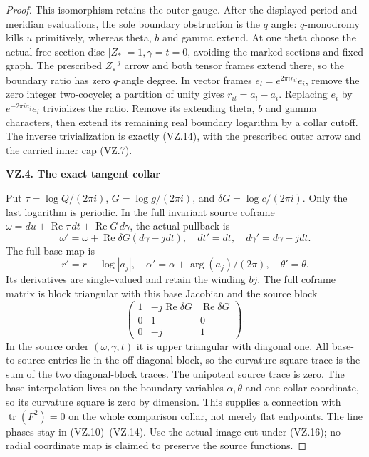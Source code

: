 \begin{proof}
This isomorphism retains the outer gauge. After the displayed period
and meridian evaluations, the sole boundary obstruction is the \(q\)
angle: \(q\)-monodromy kills \(u\) primitively, whereas theta, \(b\)
and gamma extend. At one theta choose the actual free section disc
\(|Z_*|=1,\gamma=t=0\), avoiding the marked sections and fixed graph.
The prescribed \(Z_*^{-j}\) arrow and both tensor frames extend there,
so the boundary ratio has zero \(q\)-angle degree. In vector frames
\(e_l=e^{2\pi ir_{il}}e_i\), remove the zero integer two-cocycle;
a partition of unity gives \(r_{il}=a_l-a_i\).
Replacing \(e_i\) by \(e^{-2\pi ia_i}e_i\) trivializes the ratio.
Remove its extending theta, \(b\) and gamma characters, then extend
its remaining real boundary logarithm by a collar cutoff. The inverse
trivialization is exactly (VZ.14), with the prescribed outer arrow and
the carried inner cap (VZ.7).

\par

\medskip\noindent\textbf{VZ.4. The exact tangent collar}

\par\nobreak

Put \(\tau=\log Q/(2\pi i)\), \(G=\log g/(2\pi i)\), and
\(\delta G=\log c/(2\pi i)\). Only the last logarithm is periodic.
In the full invariant source coframe
\(\omega=du+\operatorname{Re}\tau\,dt+
\operatorname{Re}G\,d\gamma\), the actual pullback is
\[
 \omega'=\omega+\operatorname{Re}\delta G(d\gamma-jdt),\quad
 dt'=dt,\quad d\gamma'=d\gamma-jdt.                   \tag{VZ.15}
\]
The full base map is
\[
 r'=r+\log|a_j|,\quad
 \alpha'=\alpha+\arg(a_j)/(2\pi),\quad\theta'=\theta.  \tag{VZ.16}
\]
Its derivatives are single-valued and retain the winding \(bj\).
The full coframe matrix is block triangular with this base Jacobian
and the source block
\[
 \begin{pmatrix}
 1&-j\operatorname{Re}\delta G&\operatorname{Re}\delta G\\
 0&1&0\\0&-j&1
 \end{pmatrix}.                                     \tag{VZ.17}
\]
In the source order \((\omega,\gamma,t)\) it is upper triangular with
diagonal one. All base-to-source entries lie in the off-diagonal block,
so the curvature-square trace is the sum of the two diagonal-block
traces. The unipotent source trace is zero. The base interpolation lives
on the boundary variables \(\alpha,\theta\) and one collar coordinate,
so its curvature square is zero by dimension. This supplies a connection
with \(\operatorname{tr}(F^2)=0\) on the whole comparison collar, not
merely flat endpoints. The line phases stay in (VZ.10)--(VZ.14).
Use the actual image cut under (VZ.16); no radial coordinate map is
claimed to preserve the source functions.


\end{proof}
